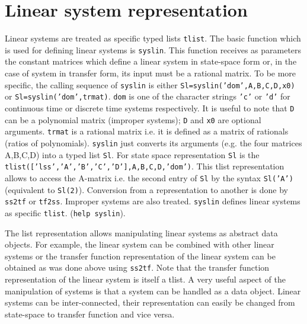 \section{Linear system representation}
Linear systems are treated as specific typed lists {\tt tlist}.
The basic function which is used for defining linear systems is {\tt syslin}.
This function receives as parameters the constant matrices which
define a linear system in state-space form or, in the case of
system in transfer form, its input must be a rational matrix.
To be more specific, the calling sequence of {\tt syslin} is
either {\tt Sl=syslin('dom',A,B,C,D,x0)} or {\tt Sl=syslin('dom',trmat)}.
{\tt dom} is one of the character strings {\tt 'c'} or {\tt 'd'}
for continuous time or discrete time systems respectively.
It is useful to note that {\tt D} can be a polynomial matrix 
(improper systems); {\tt D} and {\tt x0} are optional arguments.
{\tt trmat} is a rational matrix i.e. it is defined as a matrix
of rationals (ratios of polynomials). {\tt syslin} just converts
its arguments (e.g. the four matrices A,B,C,D) into a typed
list {\tt Sl}. For state space representation {\tt Sl} is 
the {\tt tlist(['lss','A','B','C','D'],A,B,C,D,'dom')}. This tlist
representation allows to access the A-matrix i.e. the second entry of
{\tt Sl} by the syntax {\tt Sl('A')} (equivalent to {\tt Sl(2)}).
Conversion from a representation to another is done by {\tt ss2tf}
or {\tt tf2ss}. Improper systems are also treated. {\tt syslin} 
defines linear systems as specific {\tt tlist}. ({\tt help syslin}).



	The list representation allows manipulating linear systems as
abstract data objects.  For example, the linear system can be combined
with other linear systems or the transfer function representation of
the linear system can be obtained as was done above using {\tt ss2tf}.
Note that the transfer function representation of the linear system
is itself a tlist. 
	A very useful aspect of the manipulation of systems 
is that a system can be handled as a data object.
Linear systems can be 
inter-connected,
their representation
can easily be changed from state-space to transfer function
and vice versa.

